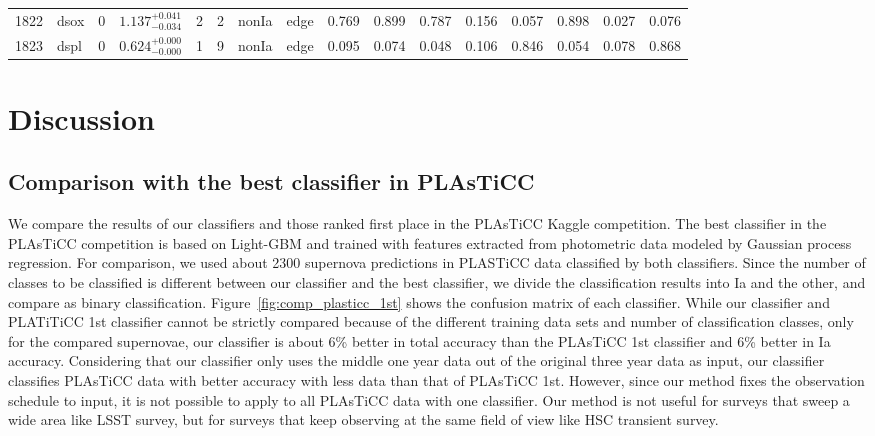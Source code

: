\documentclass[useamsfonts]{pasj01}
\begin{document}
\begin{table}[ht]
{\begin{tabular}{p{2em}p{1em}p{1em}lp{2em}p{1em}p{2em}p{2em}p{2em}p{2em}p{2em}p{2em}p{2em}p{2em}p{2em}p{2em}}
1822 &  dsox &     0 &    $1.137_{-0.034}^{+0.041}$ &         2 &    2 &  nonIa &   edge &    0.769 &    0.899 &    0.787 &    0.156 &    0.057 &    0.898 &    0.027 &    0.076 \\
1823 &  dspl &     0 &    $0.624_{-0.000}^{+0.000}$ &         1 &    9 &  nonIa &   edge &    0.095 &    0.074 &    0.048 &    0.106 &    0.846 &    0.054 &    0.078 &    0.868 \\
\hline
\end{tabular}
}\label{tab:h_results}
\end{table}

\section{Discussion}
%
\subsection{Comparison with the best classifier in PLAsTiCC}
%
We compare the results of our classifiers and those ranked first place in the PLAsTiCC Kaggle competition.
The best classifier in the PLAsTiCC competition \citep{2019arXiv190704690B} is based on Light-GBM and trained with features extracted from photometric data modeled by Gaussian process regression.
For comparison, we used about 2300 supernova predictions in PLASTiCC data classified by both classifiers.
Since the number of classes to be classified is different between our classifier and the best classifier, we divide the classification results into Ia and the other, and compare as binary classification.
Figure\ \ref{fig:comp_plasticc_1st} shows the confusion matrix of each classifier.
While our classifier and PLATiTiCC 1st classifier cannot be strictly compared because of the different training data sets and number of classification classes,
only for the compared supernovae, our classifier is about 6\% better in total accuracy than the PLAsTiCC 1st classifier and 6\% better in Ia accuracy.
Considering that our classifier only uses the middle one year data out of the original three year data as input, our classifier classifies PLAsTiCC data with better accuracy with less data than that of PLAsTiCC 1st.
However, since our method fixes the observation schedule to input, it is not possible to apply to all PLAsTiCC data with one classifier.
Our method is not useful for surveys that sweep a wide area like LSST survey, but for surveys that keep observing at the same field of view like HSC transient survey.
\end{document}
